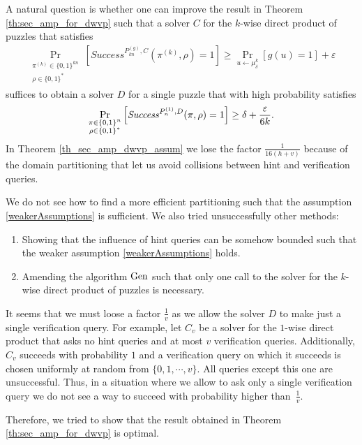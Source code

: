 A natural question is whether one can improve the result in Theorem \ref{th:sec_amp_for_dwvp} such that a solver $C$ for the $k$-wise direct product of puzzles that satisfies
\begin{align}
    \label{weakerAssumptions}
    \underset{\substack{\pi^{(k)} \in \{0,1\}^{kn} \\ \rho \in \{0,1\}^{*}}}{\Pr}\left[\mathit{Success}^{P_{kn}^{(g)}, C}(\pi^{(k)}, \rho) = 1\right]
    \geq \underset{u \leftarrow \mu_\delta^k}{\Pr}[g(u) = 1] + \varepsilon
\end{align}
suffices to obtain a solver $D$ for a single puzzle that with high probability satisfies
  \begin{align}
    \underset{\substack{\pi \in \{0,1\}^{n} \\ \rho \in \{0,1\}^{*}}}
    {\Pr}\left[\operatorname{\mathit{Success}}^{P_{n}^{(1)},D}(\pi, \rho) = 1\right] \geq \delta + \frac{\varepsilon}{6k}.
  \end{align}
In Theorem \ref{th_sec_amp_dwvp_assum} we lose the factor $\frac{1}{16(h+v)}$ because of the domain partitioning that let us avoid collisions between hint and verification queries.

We do not see how to find a more efficient partitioning such that the assumption \eqref{weakerAssumptions} is sufficient.
We also tried unsuccessfully other methods:
\begin{enumerate}[-]
  \item Showing that the influence of hint queries can be somehow bounded such that the weaker assumption \eqref{weakerAssumptions} holds. \\
  \item Amending the algorithm $\operatorname{\text{Gen}}$ such that only one call to the solver for the $k$-wise direct product of puzzles is necessary.
\end{enumerate}

It seems that we must loose a factor $\frac{1}{v}$ as we allow the solver $D$ to make just a single verification query.
For example, let $C_v$ be a solver for the $1$-wise direct product that asks no hint queries and at most $v$ verification queries.
Additionally, $C_v$ succeeds with probability $1$ and a verification query on which it succeeds is chosen uniformly at random from $\{0,1, \cdots, v\}$.
All queries except this one are unsuccessful.
Thus, in a situation where we allow to ask only a single verification query we do not see a way to succeed with probability higher than~$\frac{1}{v}$.

Therefore, we tried to show that the result obtained in Theorem \ref{th:sec_amp_for_dwvp} is optimal.

